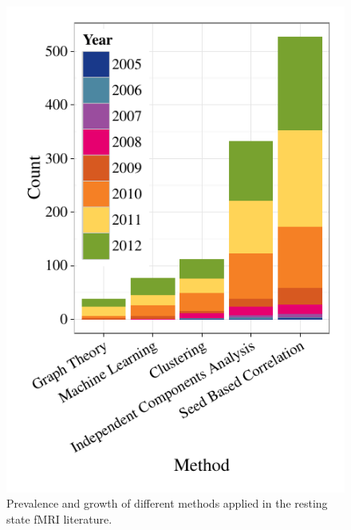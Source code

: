 \documentclass[5p]{elsarticle}
\begin{document}
\begin{figure}
  \begin{center}
    \includegraphics[]{figures/methods_growth_hist}%
    \caption{Prevalence and growth of different methods applied in the resting
    state fMRI literature. 
        \label{fig:methods_growth_hist}
    }
  \end{center}
\end{figure}
\end{document}
